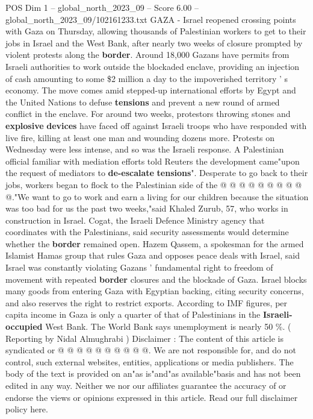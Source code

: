\begin{textsample}{POS Dim 1 – global\_north\_2023\_09 – Score 6.00 – global\_north\_2023\_09/102161233.txt}  \label{ex:f1_pos_118}
GAZA - Israel reopened crossing points with Gaza on Thursday, allowing thousands of Palestinian workers to get to their jobs in Israel and the West Bank, after nearly two weeks of closure prompted by violent protests along the \textbf{border}.
Around 18,000 Gazans have permits from Israeli authorities to work outside the blockaded enclave, providing an injection of cash amounting to some \$2 million a day to the impoverished territory ' s economy.
The move comes amid stepped-up international efforts by Egypt and the United Nations to defuse \textbf{tensions} and prevent a new round of armed conflict in the enclave.
For around two weeks, protestors throwing stones and \textbf{explosive} \textbf{devices} have faced off against Israeli troops who have responded with live fire, killing at least one man and wounding dozens more.
Protests on Wednesday were less intense, and so was the Israeli response.
A Palestinian official familiar with mediation efforts told Reuters the development came"upon the request of mediators to \textbf{de-escalate} \textbf{tensions}".
Desperate to go back to their jobs, workers began to flock to the Palestinian side of the @ @ @ @ @ @ @ @ @ @."We want to go to work and earn a living for our children because the situation was too bad for us the past two weeks,"said Khaled Zurub, 57, who works in construction in Israel.
Cogat, the Israeli Defence Ministry agency that coordinates with the Palestinians, said security assessments would determine whether the \textbf{border} remained open.
Hazem Qassem, a spokesman for the armed Islamist Hamas group that rules Gaza and opposes peace deals with Israel, said Israel was constantly violating Gazans ' fundamental right to freedom of movement with repeated \textbf{border} closures and the blockade of Gaza.
Israel blocks many goods from entering Gaza with Egyptian backing, citing security concerns, and also reserves the right to restrict exports.
According to IMF figures, per capita income in Gaza is only a quarter of that of Palestinians in the \textbf{Israeli-occupied} West Bank.
The World Bank says unemployment is nearly 50 \%. ( Reporting by Nidal Almughrabi ) Disclaimer : The content of this article is syndicated or @ @ @ @ @ @ @ @ @ @.
We are not responsible for, and do not control, such external websites, entities, applications or media publishers.
The body of the text is provided on an"as is"and"as available"basis and has not been edited in any way.
Neither we nor our affiliates guarantee the accuracy of or endorse the views or opinions expressed in this article.
Read our full disclaimer policy here.

\end{textsample}
